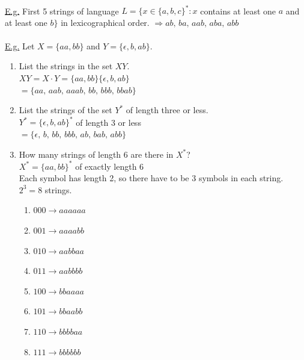 \documentclass[8pt,letterpaper,twocolumn]{article}
\begin{document}
\\
\underline{E.g.} First 5 strings of language $L = \{x \in \{a,b,c\}^* : x$
contains at least one $a$ and at least one $b\}$ in lexicographical order.
$\Rightarrow ab,\, ba,\, aab,\, aba,\, abb$\\
\\
\underline{E.g.} Let $X = \{aa, bb\}$ and $Y = \{\epsilon, b, ab\}$.
\begin{enumerate}
  \item List the strings in the set $XY$.\\
  $XY = X \cdot Y = \{aa, bb\}\{\epsilon, b, ab\}$\\
  $ = \{aa,\, aa b,\, aa ab,\, bb,\, bb b,\, bb ab\}$

  \item List the strings of the set $Y^*$ of length three or less.\\
  $Y^* = \{\epsilon, b, ab\}^*$ of length 3 or less\\
  $= \{\epsilon,\, b,\, b b,\, b b b,\, ab,\, b ab,\, ab b\}$

  \item How many strings of length 6 are there in $X^*$?\\
  $X^* = \{aa,bb\}^*$ of exactly length 6\\
  Each symbol has length 2, so there have to be 3 symbols in each string. $2^3 = 8$ strings.
  \begin{enumerate}
  	\item $000 \rightarrow aa aa aa$
 	\item $001 \rightarrow aa aa bb$
  	\item $010 \rightarrow aa bb aa$
  	\item $011 \rightarrow aa bb bb$
  	\item $100 \rightarrow bb aa aa$
  	\item $101 \rightarrow bb aa bb$
  	\item $110 \rightarrow bb bb aa$
  	\item $111 \rightarrow bb bb bb$
  \end{enumerate}
\end{enumerate}
\end{document}
